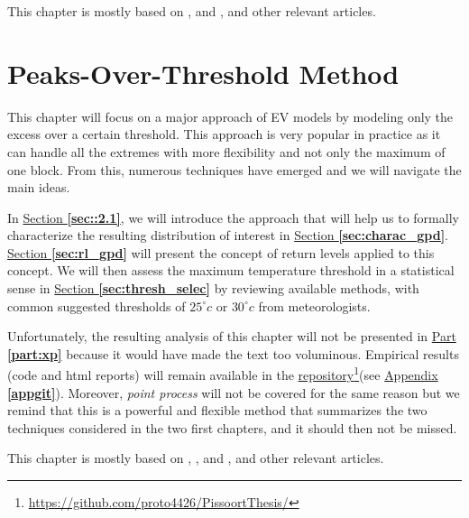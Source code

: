 \documentclass[11pt,a4paper,openany, twosided]{book}
\begin{document}
This chapter is mostly based on \citet[chap.3]{coles_introduction_2001}, \citet[chap.2]{beirlant_statistics_2006} and \citet[chap.1-4]{reiss_statistical_2007}, and other relevant articles.

\newpage




\chapter{Peaks-Over-Threshold Method}\label{sec::2}
\vspace{-1cm}
\minitoc \thispagestyle{empty}
 \vspace{1cm}

This chapter will focus on a major approach of EV models by modeling only the excess over a certain threshold. This approach is very popular in practice as it can handle all the extremes with more flexibility and not only the maximum of one block. From this, numerous techniques have emerged and we will navigate the main ideas.

In \hyperref[sec::2.1]{Section \textbf{\ref{sec::2.1}}}, we will introduce the approach that will help us 
to formally characterize the resulting distribution of interest in \hyperref[sec:charac_gpd]{Section \textbf{\ref{sec:charac_gpd}}}. \hyperref[sec:rl_gpd]{Section \textbf{\ref{sec:rl_gpd}}} will present the concept of return levels applied to this concept. We will then assess the maximum temperature threshold in a statistical sense in \hyperref[sec:thresh_selec]{Section \textbf{\ref{sec:thresh_selec}}} by reviewing available methods, with common suggested thresholds of $25^{\circ} c$ or $30^{\circ} c$ from meteorologists.

Unfortunately, the resulting analysis of this chapter will not be presented in \hyperref[part:xp]{Part \textbf{\ref{part:xp}}} because it would have made the text too voluminous. Empirical results (code and html reports) will remain available in the \href{https://github.com/proto4426/PissoortThesis/}{repository}\footnote{\url{https://github.com/proto4426/PissoortThesis/}}(see \hyperref[appgit]{Appendix \textbf{\ref{appgit}}}). Moreover, \emph{point process} will not be covered for the same reason but we remind that this is a powerful and flexible method that summarizes the two techniques considered in the two first chapters, and it should then not be missed. 

This chapter is mostly based on \citet[chap.4 and 7]{coles_introduction_2001}, \citet[chap.4]{beirlant_statistics_2006}, \citet[chap.5]{reiss_statistical_2007} and 
\citet[chap.5]{embrechts_modelling_2011},
 and other relevant articles.
\end{document}
